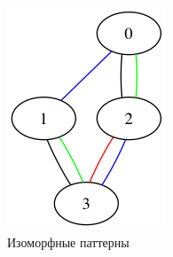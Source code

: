 \begin{figure}[H]
  \endminipage
    \includegraphics[max width=\linewidth]{fig/2/patterns/similar2.png}
  \endminipage
  \caption{Изоморфные паттерны}
  \label{fig:isomorphic_patterns}
\end{figure}


